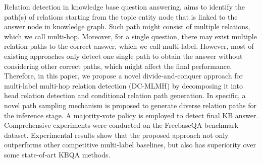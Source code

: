 Relation detection in knowledge base question answering, aims to identify the path(s) of relations starting from the topic entity node that is linked to the answer node in knowledge graph. Such path might consist of multiple relations, which we call multi-hop. Moreover, for a single question, there may exist multiple relation paths to the correct answer, which we call multi-label. However, most of existing approaches only detect one single path to obtain the answer without considering other correct paths, which might affect the final performance. Therefore, in this paper, we propose a novel divide-and-conquer approach for multi-label multi-hop relation detection (DC-MLMH) by decomposing it into head relation detection and conditional relation path generation. In specific, a novel path sampling mechanism is proposed to generate diverse relation paths for the inference stage. A majority-vote policy is employed to detect final KB answer. Comprehensive experiments were conducted on the FreebaseQA benchmark dataset. Experimental results show that the proposed approach not only outperforms other competitive multi-label baselines, but also has superiority over some state-of-art KBQA methods.
